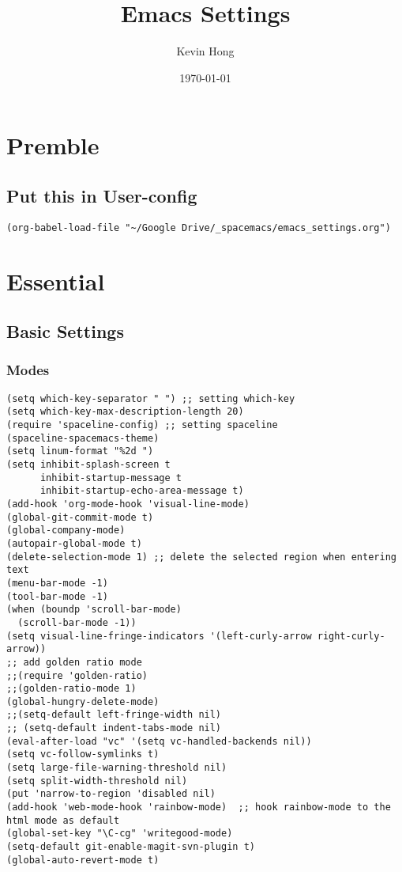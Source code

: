 \documentclass[11pt]{article}
\author{Kevin Hong}
\date{\today}
\title{Emacs Settings}
\begin{document}
\maketitle
\tableofcontents


\section{Premble}
\label{sec:orgheadline2}
\subsection{Put this in User-config}
\label{sec:orgheadline1}
\begin{verbatim}
(org-babel-load-file "~/Google Drive/_spacemacs/emacs_settings.org")
\end{verbatim}

\section{Essential}
\label{sec:orgheadline30}
\subsection{Basic Settings}
\label{sec:orgheadline21}
\subsubsection{Modes}
\label{sec:orgheadline3}
\begin{verbatim}
(setq which-key-separator " ") ;; setting which-key
(setq which-key-max-description-length 20)
(require 'spaceline-config) ;; setting spaceline
(spaceline-spacemacs-theme)
(setq linum-format "%2d ")
(setq inhibit-splash-screen t
      inhibit-startup-message t
      inhibit-startup-echo-area-message t)
(add-hook 'org-mode-hook 'visual-line-mode)
(global-git-commit-mode t)
(global-company-mode)
(autopair-global-mode t)
(delete-selection-mode 1) ;; delete the selected region when entering text
(menu-bar-mode -1)
(tool-bar-mode -1)
(when (boundp 'scroll-bar-mode)
  (scroll-bar-mode -1))
(setq visual-line-fringe-indicators '(left-curly-arrow right-curly-arrow))
;; add golden ratio mode
;;(require 'golden-ratio)
;;(golden-ratio-mode 1)
(global-hungry-delete-mode)
;;(setq-default left-fringe-width nil)
;; (setq-default indent-tabs-mode nil)
(eval-after-load "vc" '(setq vc-handled-backends nil))
(setq vc-follow-symlinks t)
(setq large-file-warning-threshold nil)
(setq split-width-threshold nil)
(put 'narrow-to-region 'disabled nil)
(add-hook 'web-mode-hook 'rainbow-mode)  ;; hook rainbow-mode to the html mode as default
(global-set-key "\C-cg" 'writegood-mode)
(setq-default git-enable-magit-svn-plugin t)
(global-auto-revert-mode t)
\end{verbatim}
\end{document}
